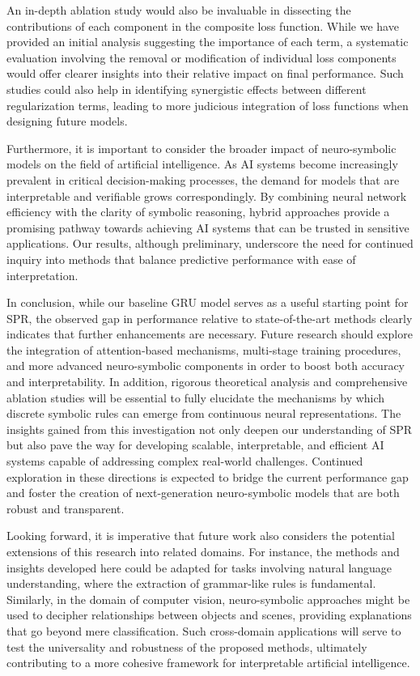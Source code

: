\documentclass[12pt]{article}
\begin{document}
An in-depth ablation study would also be invaluable in dissecting the contributions of each component in the composite loss function. While we have provided an initial analysis suggesting the importance of each term, a systematic evaluation involving the removal or modification of individual loss components would offer clearer insights into their relative impact on final performance. Such studies could also help in identifying synergistic effects between different regularization terms, leading to more judicious integration of loss functions when designing future models.

Furthermore, it is important to consider the broader impact of neuro-symbolic models on the field of artificial intelligence. As AI systems become increasingly prevalent in critical decision-making processes, the demand for models that are interpretable and verifiable grows correspondingly. By combining neural network efficiency with the clarity of symbolic reasoning, hybrid approaches provide a promising pathway towards achieving AI systems that can be trusted in sensitive applications. Our results, although preliminary, underscore the need for continued inquiry into methods that balance predictive performance with ease of interpretation.

In conclusion, while our baseline GRU model serves as a useful starting point for SPR, the observed gap in performance relative to state-of-the-art methods clearly indicates that further enhancements are necessary. Future research should explore the integration of attention-based mechanisms, multi-stage training procedures, and more advanced neuro-symbolic components in order to boost both accuracy and interpretability. In addition, rigorous theoretical analysis and comprehensive ablation studies will be essential to fully elucidate the mechanisms by which discrete symbolic rules can emerge from continuous neural representations. The insights gained from this investigation not only deepen our understanding of SPR but also pave the way for developing scalable, interpretable, and efficient AI systems capable of addressing complex real-world challenges. Continued exploration in these directions is expected to bridge the current performance gap and foster the creation of next-generation neuro-symbolic models that are both robust and transparent.

Looking forward, it is imperative that future work also considers the potential extensions of this research into related domains. For instance, the methods and insights developed here could be adapted for tasks involving natural language understanding, where the extraction of grammar-like rules is fundamental. Similarly, in the domain of computer vision, neuro-symbolic approaches might be used to decipher relationships between objects and scenes, providing explanations that go beyond mere classification. Such cross-domain applications will serve to test the universality and robustness of the proposed methods, ultimately contributing to a more cohesive framework for interpretable artificial intelligence.
\end{document}
